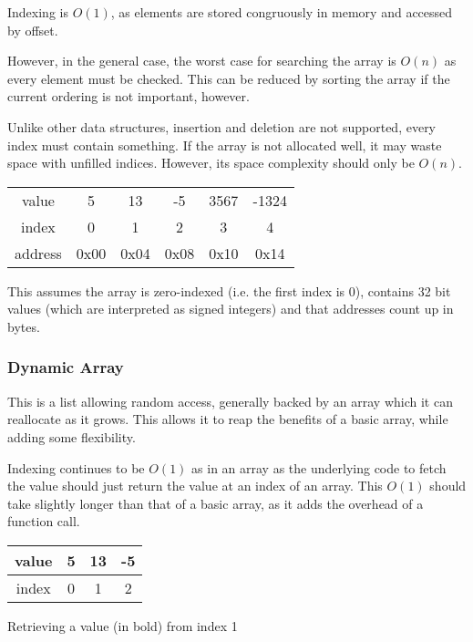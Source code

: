 \documentclass[]{article}
\begin{document}
Indexing is $O(1)$, as elements are stored congruously in memory and accessed by offset.

However, in the general case, the worst case for searching the array is $O(n)$ as every element must be checked. This can be reduced by sorting the array if the current ordering is not important, however.

Unlike other data structures, insertion and deletion are not supported, every index must contain something. If the array is not allocated well, it may waste space with unfilled indices. However, its space complexity should only be $O(n)$.

\begin{table}[h!]
\centering
\begin{tabular}{|c|c|c|c|c|c|}
\hline value & 5 & 13 & -5 & 3567 & -1324\\
index & 0 & 1 & 2 & 3 & 4 \\
\hline address & 0x00 & 0x04 & 0x08 & 0x10 & 0x14 \\
\hline
\end{tabular}
 
\vspace{2mm}

This assumes the array is zero-indexed (i.e. the first index is 0), contains 32 bit values (which are interpreted as signed integers) and that addresses count up in bytes.
\end{table}

\subsubsection{Dynamic Array}

This is a list allowing random access, generally backed by an array which it can reallocate as it grows. This allows it to reap the benefits of a basic array, while adding some flexibility.

Indexing continues to be $O(1)$ as in an array as the underlying code to fetch the value should just return the value at an index of an array. This $O(1)$ should take slightly longer than that of a basic array, as it adds the overhead of a function call.

\begin{table}[h!]
\centering
\begin{tabular}{|c|c|c|c|}
\hline value & 5 & \textbf{13} & -5 \\
\hline index & 0 & 1 & 2 \\
\hline
\end{tabular}

\vspace{2mm}

Retrieving a value (in bold) from index 1
\end{table}
\end{document}
